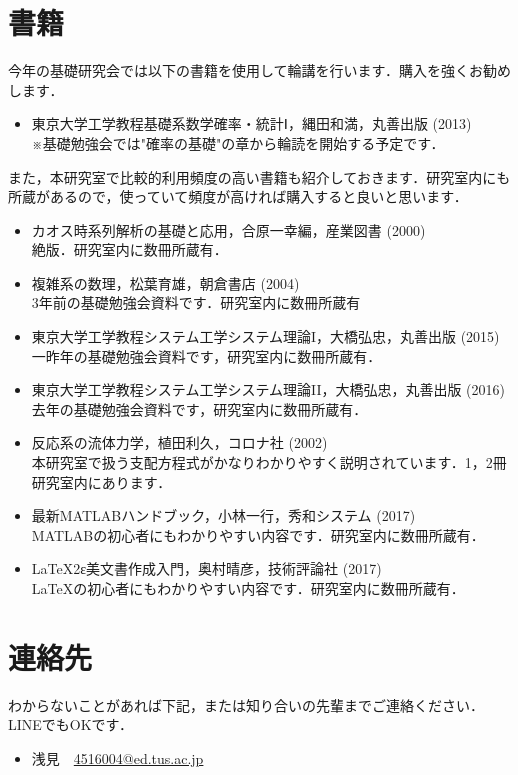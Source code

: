 \documentclass[autodetect-engine,dvipdfmx-if-dvi,ja=standard,a4paper,11pt]{bxjsarticle} %
\begin{document}
\section{書籍}
今年の基礎研究会では以下の書籍を使用して輪講を行います．購入を強くお勧めします．
\begin{itemize}
\item  東京大学工学教程基礎系数学確率・統計Ⅰ，縄田和満，丸善出版 (2013)\\
※基礎勉強会では"確率の基礎"の章から輪読を開始する予定です．
\end{itemize}
また，本研究室で比較的利用頻度の高い書籍も紹介しておきます．研究室内にも所蔵があるので，使っていて頻度が高ければ購入すると良いと思います．
\begin{itemize}
\item カオス時系列解析の基礎と応用，合原一幸編，産業図書 (2000)\\
絶版．研究室内に数冊所蔵有．
\item 複雑系の数理，松葉育雄，朝倉書店 (2004)\\
3年前の基礎勉強会資料です．研究室内に数冊所蔵有
\item 東京大学工学教程システム工学システム理論I，大橋弘忠，丸善出版 (2015)\\
一昨年の基礎勉強会資料です，研究室内に数冊所蔵有．
\item  東京大学工学教程システム工学システム理論II，大橋弘忠，丸善出版 (2016)\\
去年の基礎勉強会資料です，研究室内に数冊所蔵有．
\item 反応系の流体力学，植田利久，コロナ社 (2002)\\
本研究室で扱う支配方程式がかなりわかりやすく説明されています．1，2冊研究室内にあります．
\item 最新MATLABハンドブック，小林一行，秀和システム (2017)\\
MATLABの初心者にもわかりやすい内容です．研究室内に数冊所蔵有．
\item LaTeX2ε美文書作成入門，奥村晴彦，技術評論社 (2017)\\
\LaTeX の初心者にもわかりやすい内容です．研究室内に数冊所蔵有．
\end{itemize}

\section{連絡先}
わからないことがあれば下記，または知り合いの先輩までご連絡ください．LINEでもOKです．
\begin{itemize}
\item 浅見　\url{4516004@ed.tus.ac.jp}
\end{itemize}
\end{document}
